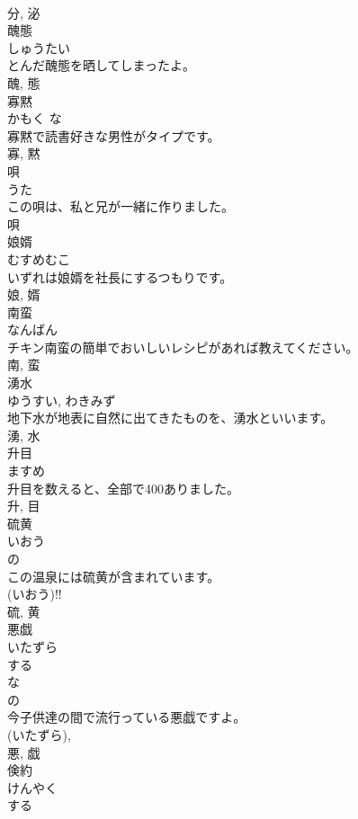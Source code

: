\documentclass[8pt]{extreport}
\begin{document}
\begin{CJK}{UTF8}{min}
\\	分, 泌	
\\	醜態	
\\	しゅうたい	
\\	とんだ醜態を晒してしまったよ。	
\\	醜, 態	
\\	寡黙	
\\	かもく	な 
\\	寡黙で読書好きな男性がタイプです。	
\\	寡, 黙	
\\	唄	
\\	うた	
\\	この唄は、私と兄が一緒に作りました。	
\\	唄	
\\	娘婿	
\\	むすめむこ	
\\	いずれは娘婿を社長にするつもりです。	
\\	娘, 婿	
\\	南蛮	
\\	なんばん	
\\	チキン南蛮の簡単でおいしいレシピがあれば教えてください。	
\\	南, 蛮	
\\	湧水	
\\	ゆうすい, わきみず	
\\	地下水が地表に自然に出てきたものを、湧水といいます。	
\\	湧, 水	
\\	升目	
\\	ますめ	
\\	升目を数えると、全部で400ありました。	
\\	升, 目	
\\	硫黄	
\\	いおう	
\\	の 
\\	この温泉には硫黄が含まれています。	
\\	(いおう)!! 
\\	硫, 黄	
\\	悪戯	
\\	いたずら	
\\	する 
\\	な 
\\	の 
\\	今子供達の間で流行っている悪戯ですよ。	
\\	(いたずら), 
\\	悪, 戯	
\\	倹約	
\\	けんやく	
\\	する 

\end{CJK}
\end{document}
